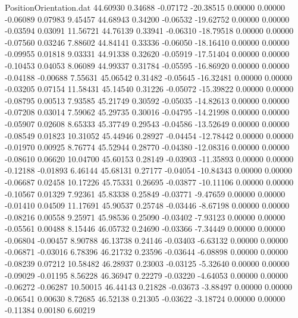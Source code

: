 \begin{filecontents}{PositionOrientation.dat}
  44.60930    0.34688   -0.07172   -20.38515    0.00000    0.00000   -0.06089    0.07983    9.45457
  44.68943    0.34200   -0.06532   -19.62752    0.00000    0.00000   -0.03594    0.03091   11.56721
  44.76139    0.33941   -0.06310   -18.79518    0.00000    0.00000   -0.07560    0.03246    7.88602
  44.84141    0.33336   -0.06050   -18.16410    0.00000    0.00000   -0.09955    0.01818    9.03331
  44.91338    0.32620   -0.05919   -17.51404    0.00000    0.00000   -0.10453    0.04053    8.06089
  44.99337    0.31784   -0.05595   -16.86920    0.00000    0.00000   -0.04188   -0.00688    7.55631
  45.06542    0.31482   -0.05645   -16.32481    0.00000    0.00000   -0.03205    0.07154   11.58431
  45.14540    0.31226   -0.05072   -15.39822    0.00000    0.00000   -0.08795    0.00513    7.93585
  45.21749    0.30592   -0.05035   -14.82613    0.00000    0.00000   -0.07208    0.03014    7.59062
  45.29735    0.30016   -0.04795   -14.21998    0.00000    0.00000   -0.05907    0.02608    8.65333
  45.37749    0.29543   -0.04586   -13.52649    0.00000    0.00000   -0.08549    0.01823   10.31052
  45.44946    0.28927   -0.04454   -12.78442    0.00000    0.00000   -0.01970    0.00925    8.76774
  45.52944    0.28770   -0.04380   -12.08316    0.00000    0.00000   -0.08610    0.06620   10.04700
  45.60153    0.28149   -0.03903   -11.35893    0.00000    0.00000   -0.12188   -0.01893    6.46144
  45.68131    0.27177   -0.04054   -10.84343    0.00000    0.00000   -0.06687    0.02458   10.17226
  45.75331    0.26695   -0.03877   -10.11106    0.00000    0.00000   -0.10567    0.01329    7.92361
  45.83338    0.25849   -0.03771    -9.47659    0.00000    0.00000   -0.01410    0.04509   11.17691
  45.90537    0.25748   -0.03446    -8.67198    0.00000    0.00000   -0.08216    0.00558    9.25971
  45.98536    0.25090   -0.03402    -7.93123    0.00000    0.00000   -0.05561    0.00488    8.15446
  46.05732    0.24690   -0.03366    -7.34449    0.00000    0.00000   -0.06804   -0.00457    8.90788
  46.13738    0.24146   -0.03403    -6.63132    0.00000    0.00000   -0.06871   -0.03016    6.78396
  46.21732    0.23596   -0.03644    -6.08898    0.00000    0.00000   -0.08239    0.07212   10.58482
  46.28937    0.23003   -0.03125    -5.32640    0.00000    0.00000   -0.09029   -0.01195    8.56228
  46.36947    0.22279   -0.03220    -4.64053    0.00000    0.00000   -0.06272   -0.06287   10.50015
  46.44143    0.21828   -0.03673    -3.88497    0.00000    0.00000   -0.06541    0.00630    8.72685
  46.52138    0.21305   -0.03622    -3.18724    0.00000    0.00000   -0.11384    0.00180    6.60219

\end{filecontents}
